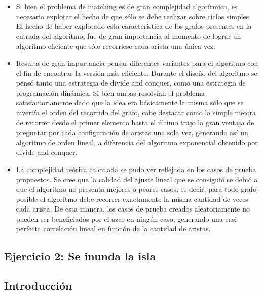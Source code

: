 \documentclass[a4paper, 12pt]{article}
\begin{document}
\begin{itemize}
\item Si bien el problema de matching es de gran complejidad algorítmica, es necesario explotar el hecho de que sólo se debe realizar sobre ciclos simples. El hecho de haber explotado esta característica de los grafos presentes en la entrada del algoritmo, fue de gran importancia al momento de lograr un algoritmo eficiente que sólo recorriese cada arista una única vez.
\item Resulta de gran importancia pensar diferentes variantes para el algoritmo con el fin de encontrar la versión más eficiente. Durante el dise\~{n}o del algoritmo se pensó tanto una estrategia de divide and conquer, como una estrategia de programación dinámica. Si bien ambas resolvían el problema satisfactoriamente dado que la idea era básicamente la misma sólo que se invertía el orden del recorrido del grafo, cabe destacar como la simple mejora de recorrer desde el primer elemento hasta el último trajo la gran ventaja de preguntar por cada configuración de aristas una sola vez, generando así un algoritmo de orden lineal, a diferencia del algoritmo exponencial obtenido por divide and conquer.
\item La complejidad teórica calculada se pudo ver reflejada en los casos de prueba propuestos. Se cree que la calidad del ajuste lineal que se consiguió se debió a que el algoritmo no presenta mejores o peores casos; es decir, para todo grafo posible el algoritmo debe recorrer exactamente la misma cantidad de veces cada arista. De esta manera, los casos de prueba creados aleatoriamente no pueden ser beneficiados por el azar en ningún caso, generando una casi perfecta correlación lineal en función de la cantidad de aristas.
\end{itemize}



\begin{center}
\item \section*{Ejercicio 2: Se inunda la isla}

\end{center}

\subsection*{Introducción}
\end{document}
